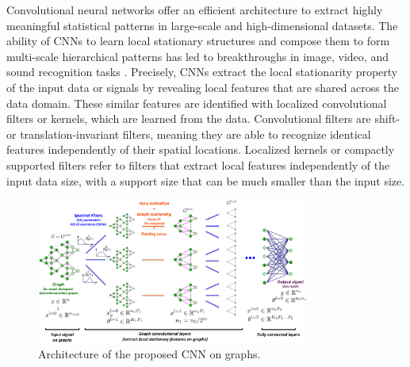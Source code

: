 \documentclass{article}
\newcommand{\G}{\mathcal{G}}
\begin{document}
Convolutional neural networks \cite{pro:LeCunBottouBengioHaffner98MNIST} offer
an efficient architecture to extract highly meaningful statistical patterns in
large-scale and high-dimensional datasets. The ability of CNNs to learn local
stationary structures and compose them to form multi-scale hierarchical
patterns has led to breakthroughs in image, video, and sound recognition tasks
\cite{art:LeCunBengioHinton15DL}. Precisely, CNNs extract the local
stationarity property of the input data or signals by revealing local features
that are shared across the data domain. These similar features are identified
with localized convolutional filters or kernels, which are learned from the
data. Convolutional filters are shift- or translation-invariant filters,
meaning they are able to recognize identical features independently of their
spatial locations. Localized kernels or compactly supported filters refer to
filters that extract local features independently of the input data size, with
a support size that can be much smaller than the input size.

\begin{figure}[t]
\centering
\includegraphics[width=0.8\textwidth]{images/illustrationCNNgraphs}
\caption{Architecture of the proposed CNN on graphs.
}
\label{fig_illustration}
\end{figure}

\end{document}
